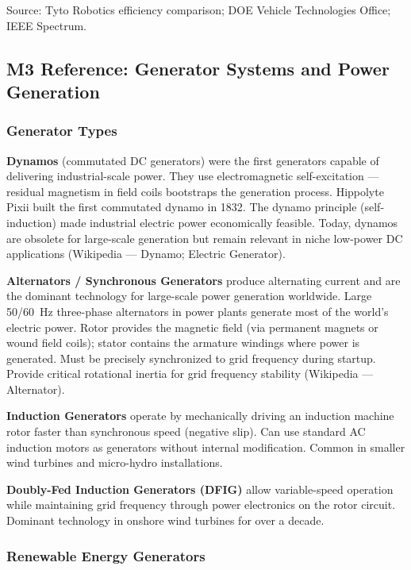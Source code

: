 \documentclass[11pt,letterpaper]{article}
\begin{document}
{\small Source: Tyto Robotics efficiency comparison; DOE Vehicle Technologies Office; IEEE Spectrum.}

\subsection{M3 Reference: Generator Systems and Power Generation}

\subsubsection{Generator Types}

\textbf{Dynamos} (commutated DC generators) were the first generators capable of delivering industrial-scale power. They use electromagnetic self-excitation --- residual magnetism in field coils bootstraps the generation process. Hippolyte Pixii built the first commutated dynamo in 1832. The dynamo principle (self-induction) made industrial electric power economically feasible. Today, dynamos are obsolete for large-scale generation but remain relevant in niche low-power DC applications (Wikipedia --- Dynamo; Electric Generator).

\textbf{Alternators / Synchronous Generators} produce alternating current and are the dominant technology for large-scale power generation worldwide. Large 50/60~Hz three-phase alternators in power plants generate most of the world's electric power. Rotor provides the magnetic field (via permanent magnets or wound field coils); stator contains the armature windings where power is generated. Must be precisely synchronized to grid frequency during startup. Provide critical rotational inertia for grid frequency stability (Wikipedia --- Alternator).

\textbf{Induction Generators} operate by mechanically driving an induction machine rotor faster than synchronous speed (negative slip). Can use standard AC induction motors as generators without internal modification. Common in smaller wind turbines and micro-hydro installations.

\textbf{Doubly-Fed Induction Generators (DFIG)} allow variable-speed operation while maintaining grid frequency through power electronics on the rotor circuit. Dominant technology in onshore wind turbines for over a decade.

\subsubsection{Renewable Energy Generators}
\end{document}
